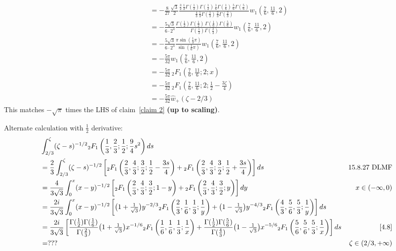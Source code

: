 \documentclass[11pt,a4paper,twoside,leqno,noamsfonts]{amsart}
\numberwithin{equation}{section}
\begin{document}
\begin{example}[Airy]
\begin{align*}
&=-\frac{8}{27} \frac{\sqrt{3}}{2} \frac{\tfrac{3}{2}\,\tfrac{1}{2}\Gamma(\tfrac{1}{2}) \Gamma(\tfrac{1}{2})\,\tfrac{1}{6}\Gamma(\tfrac{1}{6})\,\tfrac{5}{6}\Gamma(\tfrac{5}{6})}{\tfrac{4}{3}\,\tfrac{1}{3}\Gamma(\tfrac{1}{3})\,\tfrac{2}{3}\Gamma(\tfrac{2}{3})} w_1(\tfrac{7}{6}, \tfrac{11}{6}, 2) \\
&=-\frac{5\sqrt{3}}{6 \cdot 2^4} \frac{\Gamma(\tfrac{1}{2}) \Gamma(\tfrac{1}{2})\,\Gamma(\tfrac{1}{6}) \Gamma(\tfrac{5}{6})}{\Gamma(\tfrac{1}{3})\Gamma(\tfrac{2}{3})} w_1(\tfrac{7}{6}, \tfrac{11}{6}, 2) \\
&=-\frac{5\sqrt{3}}{6 \cdot 2^4} \frac{\pi \sin(\tfrac{1}{3}\pi)}{\sin(\tfrac{1}{6}\pi)} w_1(\tfrac{7}{6}, \tfrac{11}{6}, 2) \\
&=-\frac{5\pi}{32} w_1(\tfrac{7}{6}, \tfrac{11}{6}, 2) \\
&=-\frac{5\pi}{32}\,{}_2F_1\left(\frac{7}{6},\frac{11}{6};2;x\right) \\
&=-\frac{5\pi}{32}\,{}_2F_1\left(\frac{7}{6},\frac{11}{6};2;\frac{1}{2}-\frac{3\zeta}{4}\right) \\
&=-\frac{5\pi}{32}\hat{w}_+(\zeta - 2/3)
\end{align*}
This matches $-\sqrt{\pi}$ times the LHS of claim~\eqref{claim 2} \textbf{(up to scaling)}.

\color{violet}
Alternate calculation with $\tfrac{1}{2}$ derivative:
\begin{align*}
&\int_{2/3}^{\zeta}(\zeta-s)^{-1/2} {}_2F_1\left(\frac{1}{3},\frac{2}{3};\frac{1}{2};\frac{9}{4}s^2\right) ds \\
&= \frac{2}{3} \int_{2/3}^{\zeta}(\zeta-s)^{-1/2} \left[ {}_2F_1\left(\frac{2}{3},\frac{4}{3};\frac{3}{2};\frac{1}{2}-\frac{3s}{4}\right) + {}_2F_1\left(\frac{2}{3},\frac{4}{3};\frac{3}{2};\frac{1}{2}+\frac{3s}{4}\right) \right] ds & 15.8.27 \text{ DLMF} \\
&=\frac{4}{3\sqrt{3}}\int_0^x(x-y)^{-1/2}\left[ {}_2F_1\left(\frac{2}{3},\frac{4}{3};\frac{3}{2};1-y\right) + {}_2F_1\left(\frac{2}{3},\frac{4}{3};\frac{3}{2};y\right)\right]dy & x\in (-\infty,0) \\
&=\frac{2i}{3\sqrt{3}}\int_0^x(x-y)^{-1/2}\left[ \big(1+\tfrac{1}{\sqrt{3}}\big) y^{-2/3} {}_2F_1\left(\frac{2}{3}, \frac{1}{6}, \frac{1}{3};\frac{1}{y}\right) + \big(1-\tfrac{1}{\sqrt{3}}\big) y^{-4/3} {}_2F_1\left(\frac{4}{3}, \frac{5}{6}, \frac{5}{3};\frac{1}{y}\right) \right] ds \\
&=\frac{2i}{3\sqrt{3}} \left[ \frac{\Gamma(\tfrac{1}{2})\Gamma(\tfrac{1}{6})}{\Gamma(\tfrac{2}{3})} \big(1+\tfrac{1}{\sqrt{3}}\big) x^{-1/6} {}_2F_1\left(\frac{1}{6}, \frac{1}{6}, \frac{1}{3};\frac{1}{x}\right) + \frac{\Gamma(\tfrac{1}{2})\Gamma(\tfrac{5}{6})}{\Gamma(\tfrac{4}{3})}\big(1-\tfrac{1}{\sqrt{3}}\big) x^{-5/6} {}_2F_1\left(\frac{5}{6}, \frac{5}{6}, \frac{5}{3};\frac{1}{x}\right) \right] ds & \eqref{4.8} \\
&=??? & \zeta\in (2/3,+\infty)
\end{align*}
\color{black}


\end{example}
\end{document}
